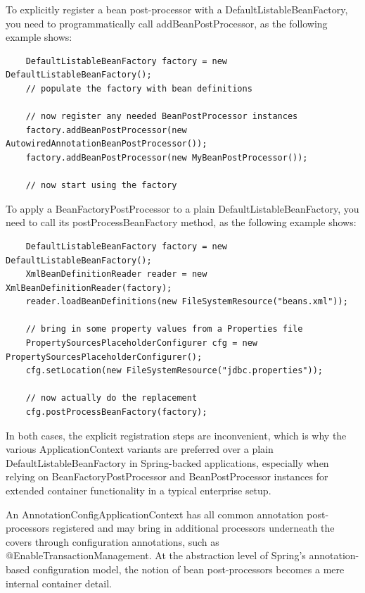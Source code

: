 \documentclass{scrartcl}
\begin{document}
To explicitly register a bean post-processor with a DefaultListableBeanFactory, you need to programmatically call addBeanPostProcessor, as the following example shows:

\begin{lstlisting}
    DefaultListableBeanFactory factory = new DefaultListableBeanFactory();
    // populate the factory with bean definitions

    // now register any needed BeanPostProcessor instances
    factory.addBeanPostProcessor(new AutowiredAnnotationBeanPostProcessor());
    factory.addBeanPostProcessor(new MyBeanPostProcessor());

    // now start using the factory

\end{lstlisting}

To apply a BeanFactoryPostProcessor to a plain DefaultListableBeanFactory, you need to call its postProcessBeanFactory method, as the following example shows:

\begin{lstlisting}
    DefaultListableBeanFactory factory = new DefaultListableBeanFactory();
    XmlBeanDefinitionReader reader = new XmlBeanDefinitionReader(factory);
    reader.loadBeanDefinitions(new FileSystemResource("beans.xml"));

    // bring in some property values from a Properties file
    PropertySourcesPlaceholderConfigurer cfg = new PropertySourcesPlaceholderConfigurer();
    cfg.setLocation(new FileSystemResource("jdbc.properties"));

    // now actually do the replacement
    cfg.postProcessBeanFactory(factory);

\end{lstlisting}


In both cases, the explicit registration steps are inconvenient, which is why the various ApplicationContext variants are preferred over a plain DefaultListableBeanFactory in Spring-backed applications, especially when relying on BeanFactoryPostProcessor and BeanPostProcessor instances for extended container functionality in a typical enterprise setup.

An AnnotationConfigApplicationContext has all common annotation post-processors registered and may bring in additional processors underneath the covers through configuration annotations, such as @EnableTransactionManagement. At the abstraction level of Spring’s annotation-based configuration model, the notion of bean post-processors becomes a mere internal container detail.
\end{document}
